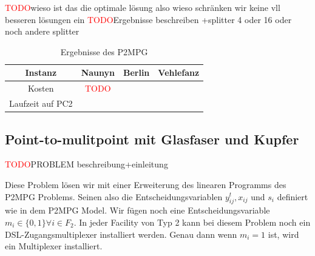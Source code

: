 \documentclass[11pt,a4paper]{article}
\newcommand{\TODO}{\textcolor{red}{TODO}}
\theoremstyle{my_th_style1}
\begin{document}
 \TODO wieso ist das die optimale lösung also wieso schränken wir keine vll besseren 
 lösungen ein
 \TODO Ergebnisse beschreiben +splitter 4 oder 16 oder noch andere splitter
 \begin{table}[h]
 	\centering
 	\begin{tabular}{c|c|c|c}
 		Instanz & Naunyn & Berlin & Vehlefanz \\	
 		\hline
 		Kosten & \TODO &  &  \\
 		Laufzeit auf PC2 &  &  & \\
 	\end{tabular}
 	\label{P2MPG}
 	\caption{Ergebnisse des P2MPG} 
 \end{table}
 
 \subsection{Point-to-mulitpoint mit Glasfaser und Kupfer}
\TODO PROBLEM beschreibung+einleitung

Diese Problem lösen wir mit einer Erweiterung des linearen Programms des P2MPG Problems. Seinen also die Entscheidungsvariablen $y_{ij}^t,x_{ij}$ und $s_i$ definiert wie in dem P2MPG Model. Wir fügen noch eine Entscheidungsvariable $m_i \in \{0,1\} \forall i \in F_2$. In jeder Facility von Typ 2 kann bei diesem Problem noch ein DSL-Zugangsmultiplexer installiert werden. Genau dann wenn $m_i=1$ ist, wird ein Multiplexer installiert.
\end{document}
